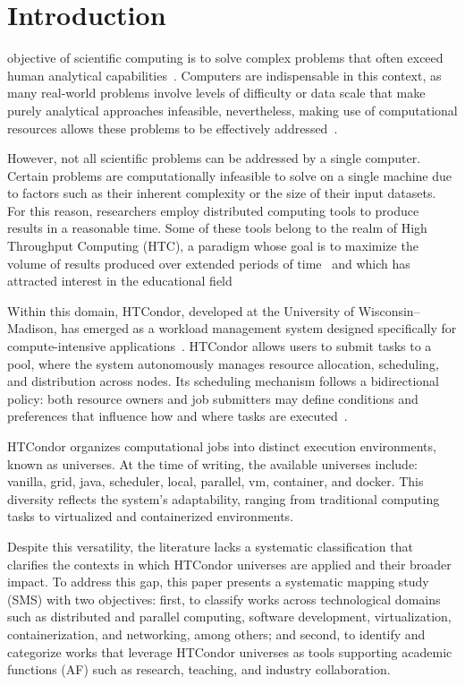 \section{Introduction}\label{sec:introduccion}
 objective of scientific computing is to solve complex problems that often exceed human analytical capabilities~\cite{landau01}. Computers are indispensable in this context, as many real-world problems involve levels of difficulty or data scale that make purely analytical approaches infeasible, nevertheless, making use of computational resources allows these problems to be effectively addressed~\cite{landau01}.


However, not all scientific problems can be addressed by a single computer. Certain problems are computationally infeasible to solve on a single machine due to factors such as their inherent complexity or the size of their input datasets. For this reason, researchers employ distributed computing tools to produce results in a reasonable time. Some of these tools belong to the realm of High Throughput Computing (HTC), a paradigm whose goal is to maximize the volume of results produced over extended periods of time~\cite{juve-01} and which has attracted interest in the educational field~\cite{Senol-01}


Within this domain, HTCondor, developed at the University of Wisconsin–Madison, has emerged as a workload management system designed specifically for compute-intensive applications~\cite{chang-01, htcondor-description}. HTCondor allows users to submit tasks to a pool, where the system autonomously manages resource allocation, scheduling, and distribution across nodes. Its scheduling mechanism follows a bidirectional policy: both resource owners and job submitters may define conditions and preferences that influence how and where tasks are executed~\cite{htcondor-description}.


HTCondor organizes computational jobs into distinct execution environments, known as universes. At the time of writing, the available universes include: vanilla, grid, java, scheduler, local, parallel, vm, container, and docker. This diversity reflects the system’s adaptability, ranging from traditional computing tasks to virtualized and containerized environments.


Despite this versatility, the literature lacks a systematic classification that clarifies the contexts in which HTCondor universes are applied and their broader impact. To address this gap, this paper presents a systematic mapping study (SMS) with two objectives: first, to classify works across technological domains such as distributed and parallel computing, software development, virtualization, containerization, and networking, among others; and second, to identify and categorize works that leverage HTCondor universes as tools supporting academic functions (AF) such as research, teaching, and industry collaboration.


